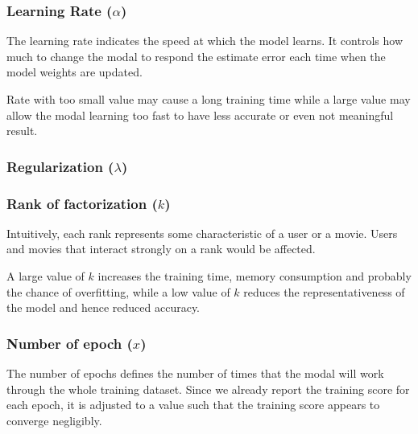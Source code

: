 \documentclass[final]{cvpr}
\begin{document}
\subsubsection{Learning Rate ($\alpha$)}
The learning rate indicates the speed at which the model learns. It controls how much to change the modal to respond the estimate error each time when the model weights are updated.

Rate with too small value may cause a long training time while a large value may allow the modal learning too fast to have less accurate or even not meaningful result.

\subsubsection{Regularization ($\lambda$)}


\subsubsection{Rank of factorization ($k$)}
Intuitively, each rank represents some characteristic of a user or a movie. Users and movies that interact strongly on a rank would be affected.

A large value of $k$ increases the training time, memory consumption and probably the chance of overfitting,
while a low value of $k$ reduces the representativeness of the model and hence reduced accuracy.

\subsubsection{Number of epoch ($x$)}
The number of epochs defines the number of times that the modal will work through the whole training dataset.
Since we already report the training score for each epoch, it is adjusted to a value such that the training score appears to converge negligibly.

\end{document}
